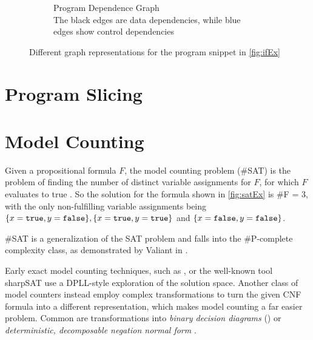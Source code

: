 \begin{figure}
\begin{subfigure}[t]{.45\textwidth}
        \caption{Program Dependence Graph\\The black edges are data dependencies, while blue edges show control dependencies}
        \label{fig:pdg}
    \end{subfigure}
    \caption{Different graph representations for the program snippet in \ref{fig:ifEx}}
\end{figure}

\section{Program Slicing}

\section{Model Counting}

Given a propositional formula $F$, the model counting problem (\#SAT) is the problem of finding the number of distinct variable assignments for $F$, for which $F$ evaluates to true \cite{biere09}. So the solution for the formula shown in  \ref{fig:satEx} is \#F = 3, with the only non-fulfilling variable assignments being $\{ x = \mathtt{true}, y = \mathtt{false}\}, \{x = \mathtt{true}, y = \mathtt{true}\}$ and  $\{x = \mathtt{false}, y = \mathtt{false}\}$.

\#SAT is a generalization of the SAT problem and falls into the \#P-complete complexity class, as demonstrated by Valiant in \cite{valiant79}.

Early exact model counting techniques, such as \cite{birnbaum99}, or the well-known tool sharpSAT \cite{thurley06} use a DPLL-style exploration of the solution space. Another class of model counters instead employ complex transformations to turn the given CNF formula into a different representation, which makes model counting a far easier problem. Common are transformations into \emph{binary decision diagrams} () or \emph{deterministic, decomposable negation normal form} \cite{darwiche04}.

